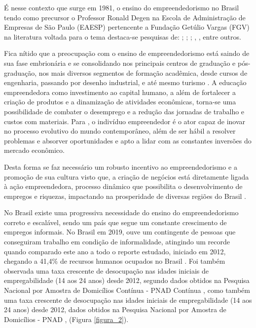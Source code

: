 É nesse contexto que surge em 1981, o ensino do empreendedorismo no Brasil tendo como precursor o Professor Ronald Degen \cite{degen_o_1989} na Escola de Administração de Empresas de São Paulo (EAESP) pertencente a Fundação Getúlio Vargas (FGV) na literatura voltada para o tema destaca-se pesquisas de: ; ; ; , , entre outros. 

Fica nítido que a preocupação com o ensino de empreendedorismo está saindo de sua fase embrionária e se consolidando nos principais centros de graduação e pós-graduação, nos mais diversos segmentos de formação acadêmica, desde cursos de engenharia, passando por desenho industrial, e até mesmo turismo \cite{henrique_praticas_2008}. A educação empreendedora como investimento ao capital humano, a além de fortalecer a criação de produtos e a dinamização de atividades econômicas, torna-se uma possibilidade de combater o desemprego \cite{morais_empreendedorismo_2018} e a redução das jornadas de trabalho e custos com materiais. Para , o indivíduo empreendedor é o ator capaz de inovar no processo evolutivo do mundo contemporâneo, além de ser hábil a resolver problemas e absorver oportunidades e apto a lidar com as constantes inversões do mercado econômico. 

Desta forma se faz necessário um robusto incentivo ao empreendedorismo e a promoção de sua cultura visto que, a criação de negócios está diretamente ligada à ação empreendedora, processo dinâmico que possibilita o desenvolvimento de empregos e riquezas, impactando na prosperidade de diversas regiões do Brasil \cite{leite_aprendizagem_2015}.

No Brasil existe uma progressiva necessidade do ensino do empreendedorismo correto e escalável, sendo um país que segue um constante crescimento de empregos informais. No Brasil em 2019, ouve um contingente de pessoas que conseguiram trabalho em condição de informalidade, atingindo um recorde quando comparado este ano a todo o reporte estudado, iniciado em 2012, chegando a 41,4\% de recursos humanos ocupados no Brasil \cite{ibge_informalidade_2019}. Foi também observada uma taxa crescente de desocupação nas idades iniciais de empregabilidade (14 aos 24 anos) desde 2012, segundo dados obtidos na Pesquisa Nacional por Amostra de Domicílios Contínua - PNAD Contínua  \cite{ibge_informalidade_2019}, como também uma taxa crescente de desocupação nas idades iniciais de empregabilidade (14 aos 24 anos) desde 2012, dados obtidos na Pesquisa Nacional por Amostra de Domicílios - PNAD \cite{ibge_pesquisa_2019}, (Figura \ref{figura_2}). 


